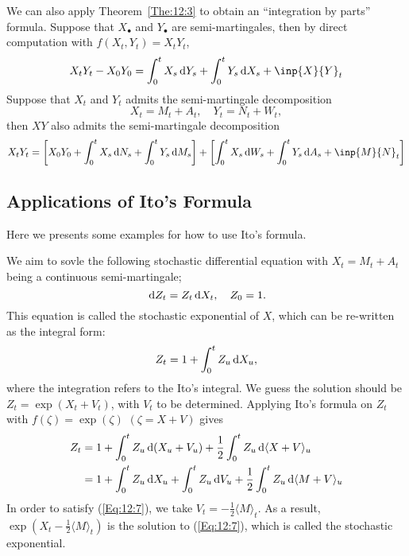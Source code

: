 \begin{example}
We can also apply Theorem~\ref{The:12:3} to obtain an ``integration by parts'' formula.
Suppose that $X_{\bullet}$ and $Y_{\bullet}$ are semi-martingales, then by direct computation with $f(X_t,Y_t)= X_tY_t$,
\[
X_tY_t - X_0Y_0 = \int_0^tX_s\diff Y_s + \int_0^tY_s\diff X_s + \inp{X}{Y}_t
\]
Suppose that $X_t$ and $Y_t$ admits the semi-martingale decomposition
\[
X_t = M_t + A_t,\quad Y_t = N_t + W_t,
\]
then $XY$ also admits the semi-martingale decomposition
\[
X_tY_t = \left[X_0Y_0 + \int_0^tX_s\diff N_s + \int_0^tY_s\diff M_s\right]
+\left[
\int_0^tX_s\diff W_s + \int_0^tY_s\diff A_s + \inp{M}{N}_t
\right]
\]
\end{example}

\subsection{Applications of Ito's Formula}

Here we presents some examples for how to use Ito's formula.

\begin{example}
We aim to sovle the following stochastic differential equation with $X_t=M_t+A_t$ being a continuous semi-martingale;
\begin{equation}
\,\mathrm{d} Z_t = Z_t\,\mathrm{d} X_t,\quad  Z_0=1.
\end{equation}
This equation is called the stochastic exponential of $X$,
which can be re-written as the integral form:
\begin{equation}\label{Eq:12:7}
Z_t = 1 + \int_0^tZ_u\diff X_u,
\end{equation}
where the integration refers to the Ito's integral.
We guess the solution should be $Z_t=\exp(X_t + V_t)$, with $V_t$ to be determined.
Applying Ito's formula on $Z_t$ with $f(\zeta)=\exp(\zeta)$ $(\zeta=X+V)$ gives
\begin{align*}
Z_t &= 1 + \int_0^tZ_u\,\mathrm{d}(X_u+V_u) +\frac{1}{2}\int_0^tZ_u\,\mathrm{d}\langle X+V\rangle_u\\
&=1 + \int_0^tZ_u\,\mathrm{d} X_u +  \int_0^tZ_u\,\mathrm{d} V_u +\frac{1}{2}\int_0^tZ_u\,\mathrm{d}\langle M+V\rangle_u
\end{align*}
In order to satisfy (\eqref{Eq:12:7}), we take $V_t=-\frac{1}{2}\langle M\rangle_t$. As a result, $\exp\left(
X_t - \frac{1}{2}\langle M\rangle_t
\right)$ is the solution to (\eqref{Eq:12:7}), which is called the stochastic exponential.
\end{example}



